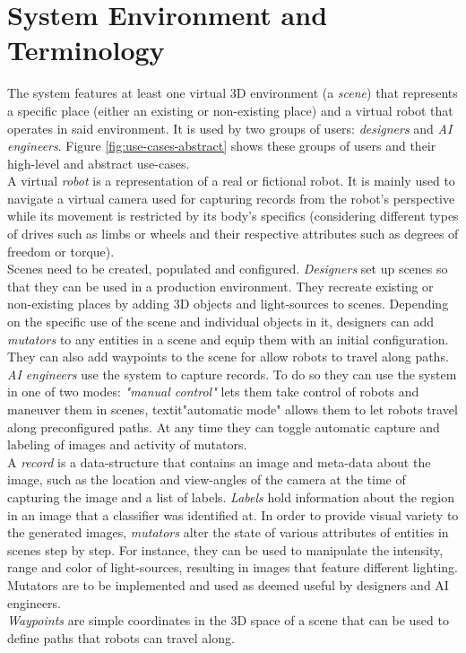 \section{System Environment and Terminology}
The system features at least one virtual 3D environment (a \textit{scene}) that represents a specific place (either an existing or non-existing place) and a virtual robot that operates in said environment. It is used by two groups of users: \textit{designers} and \textit{\ac{AI} engineers}. Figure \ref{fig:use-cases-abstract} shows these groups of users and their high-level and abstract use-cases.\\
A virtual \textit{robot} is a representation of a real or fictional robot. It is mainly used to navigate a virtual camera used for capturing records from the robot's perspective while its movement is restricted by its body's specifics (considering different types of drives such as limbs or wheels and their respective attributes such as degrees of freedom or torque).\\
Scenes need to be created, populated and configured. \textit{Designers} set up scenes so that they can be used in a production environment. They recreate existing or non-existing places by adding 3D objects and light-sources to scenes. Depending on the specific use of the scene and individual objects in it, designers can add \textit{mutators} to any entities in a scene and equip them with an initial configuration. They can also add waypoints to the scene for allow robots to travel along paths.\\
\textit{\acs{AI} engineers} use the system to capture records. To do so they can use the system in one of two modes: \textit{"manual control"} lets them take control of robots and maneuver them in scenes, textit{"automatic mode"} allows them to let robots travel along preconfigured paths. At any time they can toggle automatic capture and labeling of images and activity of mutators.\\
A \textit{record} is a data-structure that contains an image and meta-data about the image, such as the location and view-angles of the camera at the time of capturing the image and a list of labels. \textit{Labels} hold information about the region in an image that a classifier was identified at.
In order to provide visual variety to the generated images, \textit{mutators} alter the state of various attributes of entities in scenes step by step. For instance, they can be used to manipulate the intensity, range and color of light-sources, resulting in images that feature different lighting. Mutators are to be implemented and used as deemed useful by designers and AI engineers.\\
\textit{Waypoints} are simple coordinates in the 3D space of a scene that can be used to define paths that robots can travel along.\\

